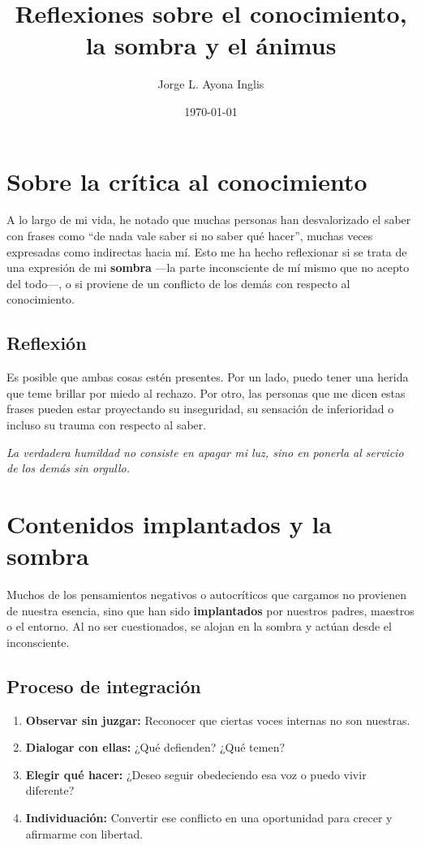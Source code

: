 \documentclass[12pt,a4paper]{article}
\title{\textbf{Reflexiones sobre el conocimiento, la sombra y el ánimus}}
\author{Jorge L. Ayona Inglis}
\date{\today}
\begin{document}
	
	\maketitle
	
	\section{Sobre la crítica al conocimiento}
	
	A lo largo de mi vida, he notado que muchas personas han desvalorizado el saber con frases como \enquote{de nada vale saber si no saber qué hacer}, muchas veces expresadas como indirectas hacia mí. Esto me ha hecho reflexionar si se trata de una expresión de mi \textbf{sombra} —la parte inconsciente de mí mismo que no acepto del todo—, o si proviene de un conflicto de los demás con respecto al conocimiento.
	
	\subsection*{Reflexión}
	Es posible que ambas cosas estén presentes. Por un lado, puedo tener una herida que teme brillar por miedo al rechazo. Por otro, las personas que me dicen estas frases pueden estar proyectando su inseguridad, su sensación de inferioridad o incluso su trauma con respecto al saber.
	
	\textit{La verdadera humildad no consiste en apagar mi luz, sino en ponerla al servicio de los demás sin orgullo.}
	
	\section{Contenidos implantados y la sombra}
	
	Muchos de los pensamientos negativos o autocríticos que cargamos no provienen de nuestra esencia, sino que han sido \textbf{implantados} por nuestros padres, maestros o el entorno. Al no ser cuestionados, se alojan en la sombra y actúan desde el inconsciente.
	
	\subsection*{Proceso de integración}
	
	\begin{enumerate}
		\item \textbf{Observar sin juzgar:} Reconocer que ciertas voces internas no son nuestras.
		\item \textbf{Dialogar con ellas:} ¿Qué defienden? ¿Qué temen?
		\item \textbf{Elegir qué hacer:} ¿Deseo seguir obedeciendo esa voz o puedo vivir diferente?
		\item \textbf{Individuación:} Convertir ese conflicto en una oportunidad para crecer y afirmarme con libertad.
	\end{enumerate}
	
\end{document}
